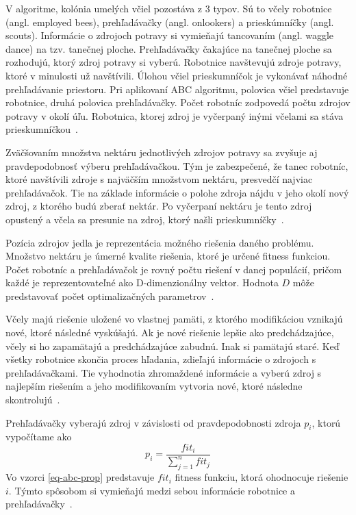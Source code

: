 \documentclass[a4paper,slovak,12pt,appendix]{article}
\begin{document}
V algoritme, kolónia umelých včiel pozostáva z 3 typov. Sú to včely
robotnice (angl. employed bees), prehľadávačky (angl. onlookers)
a prieskúmníčky (angl. scouts). Informácie o zdrojoch potravy si vymieňajú
tancovaním (angl. waggle dance) na tzv. tanečnej ploche. Prehľadávačky čakajúce na tanečnej
ploche sa rozhodujú, ktorý zdroj potravy si vyberú. Robotnice navštevujú zdroje
potravy, ktoré v minulosti už navštívili. Úlohou včiel prieskumníčok je
vykonávať náhodné prehľadávanie priestoru. Pri aplikovaní ABC algoritmu, polovica včiel
predstavuje robotnice, druhá polovica prehľadávačky. Počet robotníc zodpovedá počtu
zdrojov potravy v okolí úľu. Robotnica, ktorej zdroj je vyčerpaný inými
včelami sa stáva prieskumníčkou~\cite{Karaboga2007}.

Zväčšovaním množstva nektáru jednotlivých zdrojov potravy sa zvyšuje aj pravdepodobnosť
výberu prehľadávačkou. Tým je zabezpečené, že tanec robotníc, ktoré navštívili
zdroje s najväčším množstvom nektáru, presvedčí najviac prehľadávačok. Tie
na základe informácie o polohe zdroja nájdu v jeho okolí nový zdroj, z ktorého
budú zberať nektár. Po vyčerpaní nektáru je tento zdroj opustený a včela sa
presunie na zdroj, ktorý našli prieskumníčky~\cite{Karaboga2007}.

Pozícia zdrojov jedla je reprezentácia možného riešenia daného problému.
Množstvo nektáru je úmerné kvalite riešenia, ktoré je určené fitness funkciou.
Počet robotníc a prehľadávačok je rovný počtu riešení v danej populácií, pričom každé
je reprezentovateľné ako D-dimenzionálny vektor. Hodnota $D$ môže
predstavovať počet optimalizačných parametrov~\cite{Karaboga2007}.

Včely majú riešenie uložené vo vlastnej pamäti, z ktorého modifikáciou vznikajú
nové, ktoré následné vyskúšajú. Ak je nové riešenie lepšie ako predchádzajúce,
včely si ho zapamätajú a predchádzajúce zabudnú. Inak si pamätajú staré. Keď
všetky robotnice skončia proces hľadania, zdieľajú informácie o zdrojoch
s prehľadávačkami. Tie vyhodnotia zhromaždené informácie a vyberú zdroj s najlepším
riešením a jeho modifikovaním vytvoria nové, ktoré následne
skontrolujú~\cite{Karaboga2007}.

Prehľadávačky vyberajú zdroj v závislosti od pravdepodobnosti zdroja $p_i$,
ktorú vypočítame ako
\begin{equation}
  p_i = \frac{fit_i}{\sum_{j = 1}^{n} fit_j}
  \label{eq-abc-prop}
\end{equation}
Vo vzorci \ref{eq-abc-prop} predstavuje $fit_i$ fitness funkciu, ktorá
ohodnocuje riešenie $i$. Týmto spôsobom si vymieňajú medzi sebou informácie
robotnice a prehľadávačky~\cite{Karaboga2007}.
\end{document}
